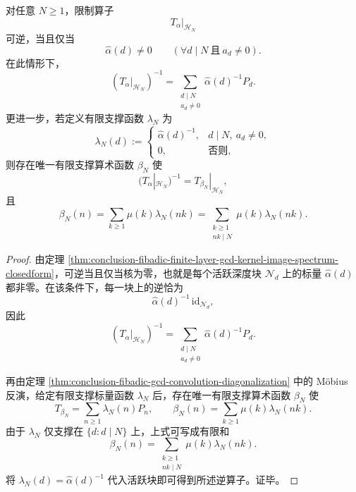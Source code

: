 \begin{theorem}\label{thm:conclusion-fibadic-finite-layer-gcd-invertibility-mobius-inverse}
对任意 \(N\ge 1\)，限制算子
\[
T_\alpha|_{\mathcal H_N}
\]
可逆，当且仅当
\[
\widehat\alpha(d)\neq 0
\qquad
(\forall d\mid N\ \text{且}\ a_d\neq 0).
\]
在此情形下，
\[
(T_\alpha|_{\mathcal H_N})^{-1}
=
\sum_{\substack{d\mid N\\ a_d\neq 0}}\widehat\alpha(d)^{-1}P_d.
\]
更进一步，若定义有限支撑函数 \(\lambda_N\) 为
\[
\lambda_N(d):=
\begin{cases}
\widehat\alpha(d)^{-1},& d\mid N,\ a_d\neq 0,\\
0,& \text{否则},
\end{cases}
\]
则存在唯一有限支撑算术函数 \(\beta_N\) 使
\[
(T_\alpha|_{\mathcal H_N})^{-1}=T_{\beta_N}|_{\mathcal H_N},
\]
且
\[
\beta_N(n)=\sum_{k\ge 1}\mu(k)\lambda_N(nk)
=
\sum_{\substack{k\ge 1\\ nk\mid N}}\mu(k)\lambda_N(nk).
\]
\end{theorem}
\begin{proof}
由定理 \ref{thm:conclusion-fibadic-finite-layer-gcd-kernel-image-spectrum-closedform}，可逆当且仅当核为零，也就是每个活跃深度块 \(\mathcal N_d\) 上的标量 \(\widehat\alpha(d)\) 都非零。在该条件下，每一块上的逆恰为
\[
\widehat\alpha(d)^{-1}\,\mathrm{id}_{\mathcal N_d},
\]
因此
\[
(T_\alpha|_{\mathcal H_N})^{-1}
=
\sum_{\substack{d\mid N\\ a_d\neq 0}}\widehat\alpha(d)^{-1}P_d.
\]

再由定理 \ref{thm:conclusion-fibadic-gcd-convolution-diagonalization} 中的 Möbius 反演，给定有限支撑标量函数 \(\lambda_N\) 后，存在唯一有限支撑算术函数 \(\beta_N\) 使
\[
T_{\beta_N}=\sum_{n\ge 1}\lambda_N(n)P_n,
\qquad
\beta_N(n)=\sum_{k\ge 1}\mu(k)\lambda_N(nk).
\]
由于 \(\lambda_N\) 仅支撑在 \(\{d:d\mid N\}\) 上，上式可写成有限和
\[
\beta_N(n)=\sum_{\substack{k\ge 1\\ nk\mid N}}\mu(k)\lambda_N(nk).
\]
将 \(\lambda_N(d)=\widehat\alpha(d)^{-1}\) 代入活跃块即可得到所述逆算子。证毕。
\end{proof}

